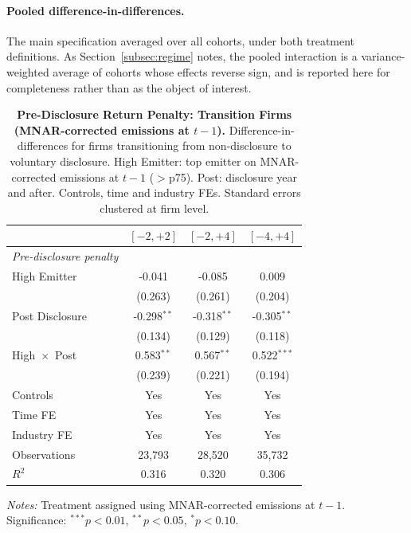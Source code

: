\documentclass[a4paper,12pt]{article}
\begin{document}
\clearpage

\paragraph{Pooled difference-in-differences.} The main specification averaged over
all cohorts, under both treatment definitions. As Section~\ref{subsec:regime}
notes, the pooled interaction is a variance-weighted average of cohorts whose
effects reverse sign, and is reported here for completeness rather than as the
object of interest.

\begin{table}[htbp]
\footnotesize\centering
\caption{\textbf{Pre-Disclosure Return Penalty: Transition Firms (MNAR-corrected emissions at $t-1$).}
Difference-in-differences for firms transitioning from non-disclosure to
voluntary disclosure.
High Emitter: top emitter on MNAR-corrected emissions at $t-1$ ($>$p75).
Post: disclosure year and after. Controls, time and industry FEs.
Standard errors clustered at firm level.}
\label{tab:returns_did_mnar}
\begin{tabular}{lccc}
\toprule
 & $[-2,+2]$ & $[-2,+4]$ & $[-4,+4]$ \\
\midrule
\textit{Pre-disclosure penalty} & & & \\[2pt]
High Emitter & -0.041 & -0.085 & 0.009 \\
 & (0.263) & (0.261) & (0.204) \\

Post Disclosure & -0.298$^{**}$ & -0.318$^{**}$ & -0.305$^{**}$ \\
 & (0.134) & (0.129) & (0.118) \\

High~$\times$~Post & 0.583$^{**}$ & 0.567$^{**}$ & 0.522$^{***}$ \\
 & (0.239) & (0.221) & (0.194) \\

\midrule
Controls    & Yes & Yes & Yes \\
Time FE     & Yes & Yes & Yes \\
Industry FE & Yes & Yes & Yes \\
Observations & 23,793 & 28,520 & 35,732 \\
$R^2$ & 0.316 & 0.320 & 0.306 \\
\bottomrule
\end{tabular}
\begin{flushleft}\footnotesize
\textit{Notes:} Treatment assigned using MNAR-corrected emissions at $t-1$.
Significance: $^{***}p<0.01$, $^{**}p<0.05$, $^{*}p<0.10$.
\end{flushleft}
\end{table}
\end{document}
